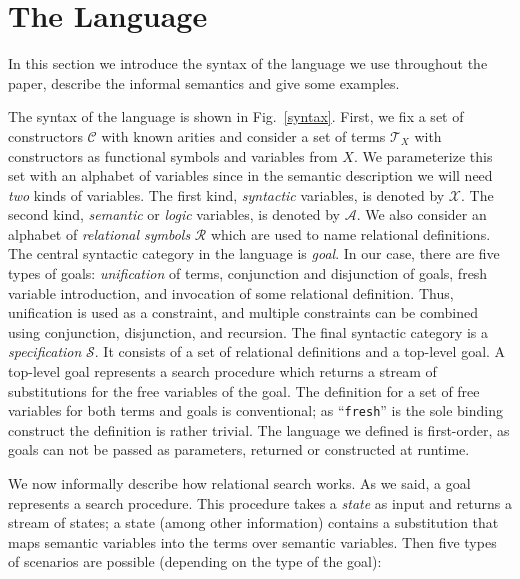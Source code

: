 \section{The Language}
\label{language}
 
In this section we introduce the syntax of the language we use throughout the paper, describe the informal semantics and give some examples.

The syntax of the language is shown in Fig.~\ref{syntax}. First, we fix a set of constructors $\mathcal{C}$ with known arities and consider
a set of terms $\mathcal{T}_X$ with constructors as functional symbols and variables from $X$. We parameterize this set with an alphabet of
variables since in the semantic description we will need \emph{two} kinds of variables. The first kind, \emph{syntactic} variables, is denoted
by $\mathcal{X}$. The second kind, \emph{semantic} or \emph{logic} variables, is denoted by $\mathcal{A}$.
We also consider an alphabet of \emph{relational symbols} $\mathcal{R}$ which are used to name relational definitions.
The central syntactic category in the language is \emph{goal}. In our case, there are five types of goals: \emph{unification} of terms,
conjunction and disjunction of goals, fresh variable introduction, and invocation of some relational definition. Thus, unification is used
as a constraint, and multiple constraints can be combined using conjunction, disjunction, and recursion.
The final syntactic category is a \emph{specification} $\mathcal{S}$. It consists of a set
of relational definitions and a top-level goal. A top-level goal represents a search procedure which returns a stream of substitutions for
the free variables of the goal. The definition for a set of free variables for both terms and goals is conventional;
as ``\lstinline|fresh|''
is the sole binding construct the definition is rather trivial. The language we defined is first-order, as goals can not be passed as parameters,
returned or constructed at runtime.

We now informally describe how relational search works. As we said, a goal represents a search procedure. This procedure takes a \emph{state} as input and returns a
stream of states; a state (among other information) contains a substitution that maps semantic variables into the terms over semantic variables. Then five types of
scenarios are possible (depending on the type of the goal):

